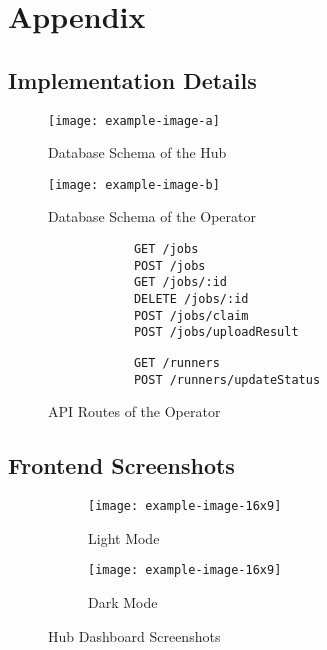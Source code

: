 \documentclass[../thesis.tex]{subfiles}
\begin{document}
    \appendix
    \chapter{Appendix}\label{ch:appendix}
    \section{Implementation Details}
    \begin{figure}[H]%
        \centering%
        \texttt{[image: example-image-a]}%
        \caption{Database Schema of the Hub}%
        \label{fig:hub-uml}%
    \end{figure}
    \begin{figure}[H]%
        \centering%
        \texttt{[image: example-image-b]}%
        \caption{Database Schema of the Operator}%
        \label{fig:operator-uml}%
    \end{figure}
    \begin{figure}[ht!]
        \centering
        \begin{verbatim}
            GET /jobs
            POST /jobs
            GET /jobs/:id
            DELETE /jobs/:id
            POST /jobs/claim
            POST /jobs/uploadResult
        \end{verbatim}
        \begin{verbatim}
            GET /runners
            POST /runners/updateStatus
        \end{verbatim}
        \caption{API Routes of the Operator}
        \label{fig:operator-api}
    \end{figure}
    \section{Frontend Screenshots}
    \begin{figure}[H]%
        \begin{subfigure}[t]{.5\textwidth}
            \centering%
            \texttt{[image: example-image-16x9]}%
            \caption{Light Mode}%
            \label{fig:hub-dashboard-light}%
        \end{subfigure}%
        \begin{subfigure}[t]{.5\textwidth}
            \centering%
            \texttt{[image: example-image-16x9]}%
            \caption{Dark Mode}%
            \label{fig:hub-dashboard-dark}%
        \end{subfigure}%
        \caption{Hub Dashboard Screenshots}%
        \label{fig:hub-dashboard}%
    \end{figure}

\end{document}

